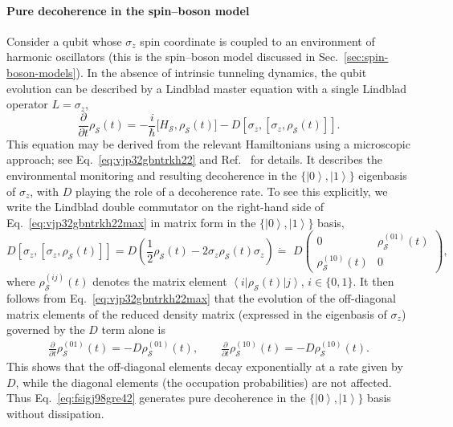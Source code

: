 \documentclass[3p,sort&compress,12pt]{elsarticle}
\newcommand{\bra}[1]{\left\langle{#1}\right\vert}
\newcommand{\ket}[1]{\left\vert{#1}\right\rangle}
\newcommand{\I}{\ensuremath{i}}
\newcommand{\op}[1]{#1}
\begin{document}
\paragraph{Pure decoherence in the spin--boson model} Consider a qubit whose $\op{\sigma}_z$ spin coordinate is coupled to an environment of harmonic oscillators (this is the spin--boson model discussed in Sec.~\ref{sec:spin-boson-models}). In the absence of intrinsic tunneling dynamics, the qubit evolution can be described by a Lindblad master equation with a single Lindblad operator $\op{L}=\op{\sigma}_z$, 
%
\begin{equation}
\label{eq:vjp32gbntrkh22max}
\frac{\partial}{\partial t} \op{\rho}_\mathcal{S}(t) = -\frac{\I}{\hbar} \bigl[
  \op{H}_\mathcal{S}, \op{\rho}_\mathcal{S}(t) \bigr] -
D \left[ \op{\sigma}_z, \left[ \op{\sigma}_z,
    \op{\rho}_\mathcal{S}(t) \right]\right].
\end{equation}
%
This equation may be derived from the relevant Hamiltonians using a microscopic approach; see Eq.~\eqref{eq:vjp32gbntrkh22}  and Ref.~\cite{Schlosshauer:2007:un} for details. It describes the environmental monitoring and resulting decoherence in the $\{\ket{0},\ket{1}\}$ eigenbasis of $\op{\sigma}_z$, with $D$ playing the role of a decoherence rate.  To see this explicitly, we write the Lindblad double commutator on the right-hand side of Eq.~\eqref{eq:vjp32gbntrkh22max} in matrix form in the $\{\ket{0},\ket{1}\}$ basis, 
%
\begin{equation}
  \label{eq:fsigj98gre42}
  D \left[ \op{\sigma}_z, \left[ \op{\sigma}_z,
    \op{\rho}_\mathcal{S}(t) \right]\right] = D \left(
  \frac{1}{2} \op{\rho}_\mathcal{S}(t) - 2\op{\sigma}_z
  \op{\rho}_\mathcal{S}(t) \op{\sigma}_z \right) \dot{=}
\,\,D \left( \begin{array}{cc} 0 & \rho_\mathcal{S}^{(01)}(t) \\
    \rho_\mathcal{S}^{(10)}(t) & 0\end{array} \right),
\end{equation}
%
where $\rho_\mathcal{S}^{(ij)}(t)$ denotes the matrix element $\bra{i} \op{\rho}_\mathcal{S}(t) \ket{j}$, $i \in \{0,1\}$. It then follows from Eq.~\eqref{eq:vjp32gbntrkh22max} that the evolution of the off-diagonal matrix elements of the reduced density matrix (expressed in the eigenbasis of $\op{\sigma}_z$) governed by the $D$ term alone is
%
\begin{align}
  \label{eq:44}
  \frac{\partial}{\partial t} \rho_\mathcal{S}^{(01)}(t) = -
  D\rho_\mathcal{S}^{(01)}(t), \qquad
  \frac{\partial}{\partial t} \rho_\mathcal{S}^{(10)}(t) = - D\rho_\mathcal{S}^{(10)}(t).
\end{align}
%
This shows that the off-diagonal elements decay exponentially at a rate given by $D$, while the diagonal elements (the occupation probabilities) are not affected. Thus Eq.~\eqref{eq:fsigj98gre42} generates pure decoherence in the $\{\ket{0},\ket{1}\}$ basis without dissipation.
\end{document}
